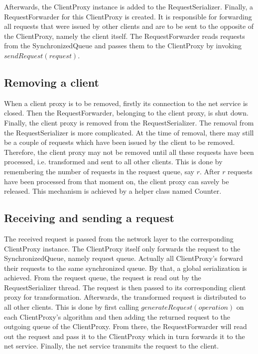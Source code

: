 Afterwards, the ClientProxy instance is added to the RequestSerializer. Finally, a RequestForwarder for this ClientProxy is created. It is responsible for forwarding all requests that were issued by other clients and are to be sent to the opposite of the ClientProxy, namely the client itself. The RequestForwarder reads requests from the SynchronizedQueue and passes them to the ClientProxy by invoking $sendRequest(request)$.

\subsection{Removing a client}
When a client proxy is to be removed, firstly its connection to the net service is closed. Then the RequestForwarder, belonging to the client proxy, is shut down. Finally, the client proxy is removed from the RequestSerializer. The removal from the RequestSerializer is more complicated. At the time of removal, there may still be a couple of requests which have been issued by the client to be removed. Therefore, the client proxy may not be removed until all these requests have been processed, i.e. transformed and sent to all other clients. This is done by remembering the number of requests in the request queue, say $r$. After $r$ requests have been processed from that moment on, the client proxy can savely be released. This mechanism is achieved by a helper class named Counter.

\subsection{Receiving and sending a request}
The received request is passed from the network layer to the corresponding ClientProxy instance. The ClientProxy itself only forwards the request to the SynchronizedQueue, namely request queue. Actually all ClientProxy's forward their requests to the same synchronized queue. By that, a global serialization is achieved. From the request queue, the request is read out by the RequestSerializer thread. The request is then passed to its corresponding client proxy for transformation. Afterwards, the transformed request is distributed to all other clients. This is done by first calling $generateRequest(operation)$ on each ClientProxy's algorithm and then adding the returned request to the outgoing queue of the ClientProxy. From there, the RequestForwarder will read out the request and pass it to the ClientProxy which in turn forwards it to the net service. Finally, the net service transmits the request to the client.

